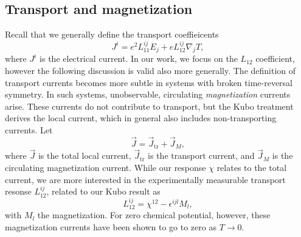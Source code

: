 \subsection{Transport and magnetization}
Recall that we generally define the transport coeffieicents
\[
J^i = e^2 L^{ij}_{11} E_j + e L_{12}^{ij} \nabla_jT,
\]
where \( J^i \) is the electrical current.
In our work, we focus on the \( L_{12} \) coefficient, however the following discussion is valid also more generally.
The definition of transport currents becomes more subtle in systems with broken time-reversal symmetry\cite{vanderwurffMagnetovorticalThermoelectricTransport2019, chernodubThermalTransportGeometry2021}.
In such systems, unobservable, circulating \emph{magnetization} currents arise.
These currents do not contribute to transport, but the Kubo treatment derives the local current, which in general also includes non-transporting currents.
Let
\begin{equation}
  \label{eq:23}
  \vec{J} = \vec{J}_{\text{tr}} + \vec{J}_M,
\end{equation}
where \( \vec{J} \) is the total local current, \( \vec{J}_{\text{tr}} \) is the transport current, and \( \vec{J}_M \) is the circulating magnetization current.
While our response \( \chi \) relates to the total current, we are more interested in the experimentally measurable transport resonse \( L^{ij}_{12} \), related to our Kubo result as \cite{arjonaFingerprintsConformalAnomaly2019}
\begin{equation}
  \label{eq:24}
  L_{12}^{ij} = \chi^{12} - \epsilon^{ijl} M_l,
\end{equation}
with \( M_l \) the magnetization.
For zero chemical potential, however, these magnetization currents have been shown to go to zero as \( T \to 0 \).


